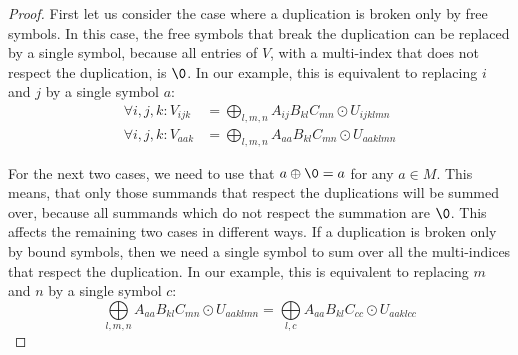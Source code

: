 \begin{proof}
    First let us consider the case where a duplication is broken only by free symbols.
    In this case, the free symbols that break the duplication can be replaced by a single symbol,
    because all entries of $V$, with a multi-index that does not respect the duplication, is $\0$.
    In our example, this is equivalent to replacing $i$ and $j$ by a single symbol $a$:
    \begin{align*}
        \forall i,j,k: V_{ijk} & = \bigoplus\limits_{l,m,n} A_{ij} B_{kl} C_{mn} \odot U_{ijklmn} \\
        \forall i,j,k: V_{aak} & = \bigoplus\limits_{l,m,n} A_{aa} B_{kl} C_{mn} \odot U_{aaklmn}
    \end{align*}

    For the next two cases, we need to use that $a \oplus \0 = a$ for any $a \in M$.
    This means, that only those summands that respect the duplications will be summed over,
    because all summands which do not respect the summation are $\0$.
    This affects the remaining two cases in different ways.
    If a duplication is broken only by bound symbols, then we need a single symbol to sum over all the multi-indices that respect the duplication.
    In our example, this is equivalent to replacing $m$ and $n$ by a single symbol $c$:
    $$\bigoplus\limits_{l,m,n} A_{aa} B_{kl} C_{mn} \odot U_{aaklmn} = \bigoplus\limits_{l,c} A_{aa} B_{kl} C_{cc} \odot U_{aaklcc}$$


\end{proof}
